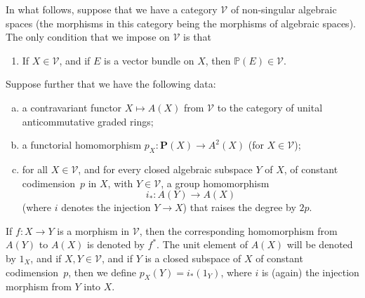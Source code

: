 \documentclass{article}
\theoremstyle{plain}
\theoremstyle{definition}
\newcommand{\cat}[1]{{\mathcal{#1}}}
\newcommand{\PP}{\mathbf{P}}
\newcommand{\oldpage}[1]{\marginpar{\footnotesize$\Big\vert$ \textit{p.~#1}}}
\begin{document}
\oldpage{140}

In what follows, suppose that we have a category $\cat{V}$ of non-singular algebraic spaces (the morphisms in this category being the morphisms of algebraic spaces).
The only condition that we impose on $\cat{V}$ is that
\begin{enumerate}[({V}1)]
  \item\label{axiomV1}
    If $X\in\cat{V}$, and if $E$ is a vector bundle on $X$, then $\mathbb{P}(E)\in\cat{V}$.
\end{enumerate}

Suppose further that we have the following data:
\begin{enumerate}[a.]
  \item\label{dataa}
    a contravariant functor $X\mapsto A(X)$ from $\cat{V}$ to the category of unital anticommutative graded rings;
  \item\label{datab}
    a functorial homomorphism $p_X\colon\PP(X)\to A^2(X)$ (for $X\in\cat{V}$);
  \item\label{datac}
    for all $X\in\cat{V}$, and for every closed algebraic subspace $Y$ of $X$, of constant codimension~$p$ in $X$, with $Y\in\cat{V}$, a group homomorphism
    \[
      i_*\colon A(Y)\to A(X)
    \]
    (where $i$ denotes the injection $Y\to X$) that raises the degree by $2p$.
\end{enumerate}

If $f\colon X\to Y$ is a morphism in $\cat{V}$, then the corresponding homomorphism from $A(Y)$ to $A(X)$ is denoted by $f^*$.
The unit element of $A(X)$ will be denoted by $1_X$, and if $X,Y\in\cat{V}$, and if $Y$ is a closed subspace of $X$ of constant codimension~$p$, then we define $p_X(Y)=i_*(1_Y)$, where $i$ is (again) the injection morphism from $Y$ into $X$.
\end{document}
